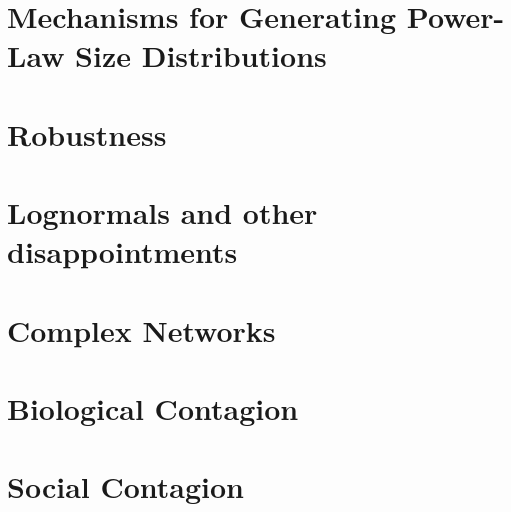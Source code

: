 


\cleartoleftpage
{}
\chapter{Mechanisms for Generating Power-Law Size Distributions}
\label{ch:pocsbook.powerlawsizemechanisms}



\cleartoleftpage
{}
\chapter{Robustness}
\label{ch:pocsbook.robustness}


\chapter{Lognormals and other disappointments}


\cleartoleftpage
{}
\chapter{Complex Networks}
\label{ch:pocsbook.complexnetworks}



\cleartoleftpage
{}
\chapter{Biological Contagion}
\label{ch:pocsbook.biologicalcontagion}


\cleartoleftpage
{}
\chapter{Social Contagion}
\label{ch:pocsbook.socialcontagion}

